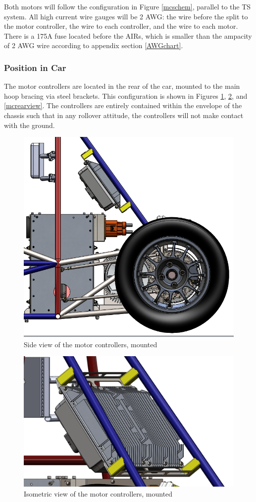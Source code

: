 \documentclass{article}
\begin{document}

            Both motors will follow the configuration in Figure \ref{mcschem}, parallel to the TS system. All high current wire gauges will be 2 AWG: the wire before the split to the motor controller, the wire to each controller, and the wire to each motor. There is a 175A fuse located before the AIRs, which is smaller than the ampacity of 2 AWG wire according to appendix section \ref{AWGchart}.

        \subsubsection{Position in Car}

            The motor controllers are located in the rear of the car, mounted to the main hoop bracing via steel brackets. This configuration is shown in Figures \ref{mcsideview}, \ref{mciso}, and \ref{mcrearview}. The controllers are entirely contained within the envelope of the chassis such that in any rollover attitude, the controllers will not make contact with the ground.

            \begin{figure}[H]
                \centering
                \includegraphics[width = 0.6 \textwidth]{motorcontroller_sideview}
                \caption{Side view of the motor controllers, mounted}
                \label{mcsideview}
            \end{figure}

            \begin{figure}[H]
                \centering
                \includegraphics[width = 0.6 \textwidth]{motorcontroller_isoview}
                \caption{Isometric view of the motor controllers, mounted}
                \label{mciso}
            \end{figure}
\end{document}

